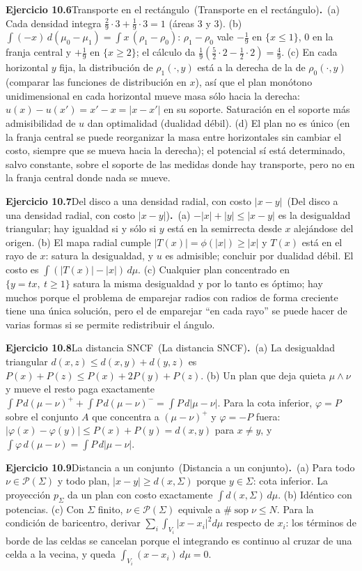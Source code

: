 \documentclass[11pt,a4paper]{amsart}
\def\sop{\operatorname {\mathrm{sop}}}
\theoremstyle{remark}
\theoremstyle{definition}
\numberwithin{subsection}{section}
\numberwithin{equation}{section}
\newcommand{\ejlabel}[2]{\par\medskip\noindent\textbf{Ejercicio #1}\ifx\relax#2\relax\else\ (#2)\fi\textbf{.}\ }
\begin{document}
\ejlabel{10.6}{Transporte en el rectángulo}(a) Cada densidad integra $\frac29\cdot3+\frac19\cdot3=1$ (áreas $3$ y $3$). (b) $\int(-x)\,d(\mu_0-\mu_1)=\int x\,(\rho_1-\rho_0)$: $\rho_1-\rho_0$ vale $-\frac19$ en $\{x\le1\}$, $0$ en la franja central y $+\frac19$ en $\{x\ge2\}$; el cálculo da $\frac19(\frac52\cdot2-\frac12\cdot2)=\frac49$. (c) En cada horizontal $y$ fija, la distribución de $\rho_1(\cdot,y)$ está a la derecha de la de $\rho_0(\cdot,y)$ (comparar las funciones de distribución en $x$), así que el plan monótono unidimensional en cada horizontal mueve masa sólo hacia la derecha: $u(x)-u(x')=x'-x=|x-x'|$ en su soporte. Saturación en el soporte más admisibilidad de $u$ dan optimalidad (dualidad débil). (d) El plan no es único (en la franja central se puede reorganizar la masa entre horizontales sin cambiar el costo, siempre que se mueva hacia la derecha); el potencial sí está determinado, salvo constante, sobre el soporte de las medidas donde hay transporte, pero no en la franja central donde nada se mueve.

\ejlabel{10.7}{Del disco a una densidad radial, con costo $|x-y|$}(a) $-|x|+|y|\le|x-y|$ es la desigualdad triangular; hay igualdad si y sólo si $y$ está en la semirrecta desde $x$ alejándose del origen. (b) El mapa radial cumple $|T(x)|=\phi(|x|)\ge|x|$ y $T(x)$ está en el rayo de $x$: satura la desigualdad, y $u$ es admisible; concluir por dualidad débil. El costo es $\int(|T(x)|-|x|)\,d\mu$. (c) Cualquier plan concentrado en $\{y=tx,\ t\ge1\}$ satura la misma desigualdad y por lo tanto es óptimo; hay muchos porque el problema de emparejar radios con radios de forma creciente tiene una única solución, pero el de emparejar ``en cada rayo'' se puede hacer de varias formas si se permite redistribuir el ángulo.

\ejlabel{10.8}{La distancia SNCF}(a) La desigualdad triangular $d(x,z)\le d(x,y)+d(y,z)$ es $P(x)+P(z)\le P(x)+2P(y)+P(z)$. (b) Un plan que deja quieta $\mu\wedge\nu$ y mueve el resto paga exactamente $\int P\,d(\mu-\nu)^++\int P\,d(\mu-\nu)^-=\int P\,d|\mu-\nu|$. Para la cota inferior, $\varphi=P$ sobre el conjunto $A$ que concentra a $(\mu-\nu)^+$ y $\varphi=-P$ fuera: $|\varphi(x)-\varphi(y)|\le P(x)+P(y)=d(x,y)$ para $x\ne y$, y $\int\varphi\,d(\mu-\nu)=\int P\,d|\mu-\nu|$.

\ejlabel{10.9}{Distancia a un conjunto}(a) Para todo $\nu\in\mathcal P(\Sigma)$ y todo plan, $|x-y|\ge d(x,\Sigma)$ porque $y\in\Sigma$: cota inferior. La proyección $p_\Sigma$ da un plan con costo exactamente $\int d(x,\Sigma)\,d\mu$. (b) Idéntico con potencias. (c) Con $\Sigma$ finito, $\nu\in\mathcal P(\Sigma)$ equivale a $\#\sop\nu\le N$. Para la condición de baricentro, derivar $\sum_i\int_{V_i}|x-x_i|^2d\mu$ respecto de $x_i$: los términos de borde de las celdas se cancelan porque el integrando es continuo al cruzar de una celda a la vecina, y queda $\int_{V_i}(x-x_i)\,d\mu=0$.
\end{document}
